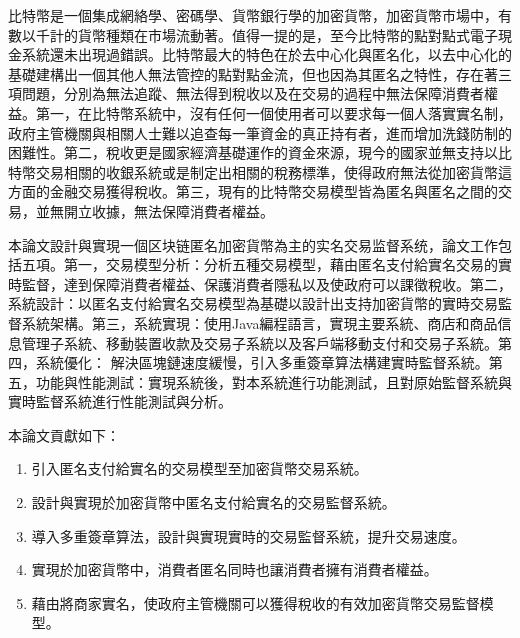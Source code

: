
\begin{cabstract}

	比特幣是一個集成網絡學、密碼學、貨幣銀行學的加密貨幣，加密貨幣市場中，有數以千計的貨幣種類在市場流動著。值得一提的是，至今比特幣的點對點式電子現金系統還未出現過錯誤。比特幣最大的特色在於去中心化與匿名化，以去中心化的基礎建構出一個其他人無法管控的點對點金流，但也因為其匿名之特性，存在著三項問題，分別為無法追蹤、無法得到稅收以及在交易的過程中無法保障消費者權益。第一，在比特幣系統中，沒有任何一個使用者可以要求每一個人落實實名制，政府主管機關與相關人士難以追查每⼀筆資金的真正持有者，進而增加洗錢防制的困難性。第二，稅收更是國家經濟基礎運作的資金來源，現今的國家並無支持以比特幣交易相關的收銀系統或是制定出相關的稅務標準，使得政府無法從加密貨幣這方面的金融交易獲得稅收。第三，現有的比特幣交易模型皆為匿名與匿名之間的交易，並無開立收據，無法保障消費者權益。

	本論文設計與實現一個区块链匿名加密貨幣為主的实名交易监督系统，論文工作包括五項。第一，交易模型分析：分析五種交易模型，藉由匿名支付給實名交易的實時監督，達到保障消費者權益、保護消費者隱私以及使政府可以課徵稅收。第二，系統設計：以匿名支付給實名交易模型為基礎以設計出支持加密貨幣的實時交易監督系統架構。第三，系統實現：使用Java編程語言，實現主要系統、商店和商品信息管理子系統、移動裝置收款及交易子系統以及客戶端移動支付和交易子系統。第四，系統優化：
	解決區塊鏈速度緩慢，引入多重簽章算法構建實時監督系統。第五，功能與性能測試：實現系統後，對本系統進行功能測試，且對原始監督系統與實時監督系統進行性能測試與分析。

	本論文貢獻如下：
	\begin{enumerate}
		\item 引入匿名支付給實名的交易模型至加密貨幣交易系統。
		\item 設計與實現於加密貨幣中匿名支付給實名的交易監督系統。
		\item 導入多重簽章算法，設計與實現實時的交易監督系統，提升交易速度。
		\item 實現於加密貨幣中，消費者匿名同時也讓消費者擁有消費者權益。
		\item 藉由將商家實名，使政府主管機關可以獲得稅收的有效加密貨幣交易監督模型。
	\end{enumerate}


\end{cabstract}

